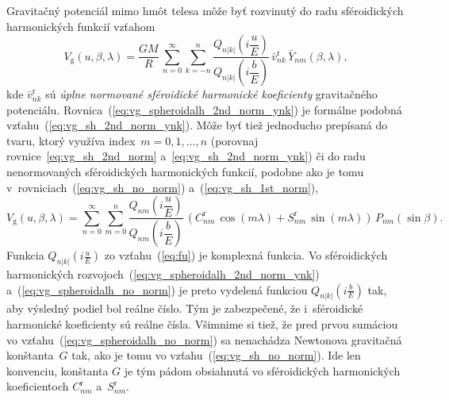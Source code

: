 \documentclass[a4paper,12pt]{book}
\newcommand{\gidx}{\mathrm g}
\begin{document}
Gravitačný potenciál mimo hmôt telesa môže byť rozvinutý do radu sféroidických 
harmonických funkcií vzťahom
%
\begin{equation}
\label{eq:vg_spheroidalh_2nd_norm_ynk}
V_\gidx(u, \beta, \lambda) = \frac{GM}{R} \, \sum_{n = 0}^\infty \sum_{k 
= -n}^n \frac{Q_{n|k|}\left( i \dfrac{u}{E} \right)}{Q_{n|k|}\left( 
i \dfrac{b}{E} \right)} \, \bar{v}^{\mathrm{r}}_{nk} \, \bar{Y}_{nm}(\beta, 
\lambda){,}
\end{equation}
%
kde $\bar{v}_{nk}^\mathrm{r}$ sú \emph{úplne normované sféroidické harmonické 
koeficienty} gravitačného potenciálu.  
Rovnica~(\ref{eq:vg_spheroidalh_2nd_norm_ynk}) je formálne podobná 
vzťahu~(\ref{eq:vg_sh_2nd_norm_ynk}).  Môže byť tiež jednoducho prepísaná do 
tvaru, ktorý využíva index~$m = 0, 1, \dots, n$ (porovnaj 
rovnice~\ref{eq:vg_sh_2nd_norm} a~\ref{eq:vg_sh_2nd_norm_ynk}) či do radu 
nenormovaných sféroidických harmonických funkcií, podobne ako je tomu 
v~rovniciach~(\ref{eq:vg_sh_no_norm}) a~(\ref{eq:vg_sh_1st_norm}),
%
\begin{equation}
\label{eq:vg_spheroidalh_no_norm}
V_\gidx(u, \beta, \lambda) = \sum_{n = 0}^\infty \sum_{m = 0}^n 
\frac{Q_{nm}\left( i \dfrac{u}{E} \right)}{Q_{nm}\left( i \dfrac{b}{E} \right)} 
\, \left( C^{\mathrm{r}}_{nm} \, \cos(m\lambda) + S^{\mathrm{r}}_{nm} \, 
\sin(m\lambda) \right) \, P_{nm}(\sin\beta){.}
\end{equation}
%
Funkcia $Q_{n|k|}\left( i \frac{u}{E} \right)$ zo vzťahu~(\ref{eq:fu}) je 
komplexná funkcia.  Vo sféroidických harmonických 
rozvojoch~(\ref{eq:vg_spheroidalh_2nd_norm_ynk}) 
a~(\ref{eq:vg_spheroidalh_no_norm}) je preto vydelená funkciou $Q_{n|k|}\left( 
i \frac{b}{E} \right)$ tak, aby výsledný podiel bol reálne číslo.  Tým je 
zabezpečené, že i~sféroidické harmonické koeficienty sú reálne čísla.  Všimnime 
si tiež, že pred prvou sumáciou vo vzťahu~(\ref{eq:vg_spheroidalh_no_norm}) sa 
nenachádza Newtonova gravitačná konštanta~$G$ tak, ako je tomu vo 
vzťahu~(\ref{eq:vg_sh_no_norm}).  Ide len konvenciu, konštanta $G$ je tým pádom 
obsiahnutá vo sféroidických harmonických koeficientoch $C_{nm}^\mathrm{r}$ 
a~$S_{nm}^\mathrm{r}$.
\end{document}
